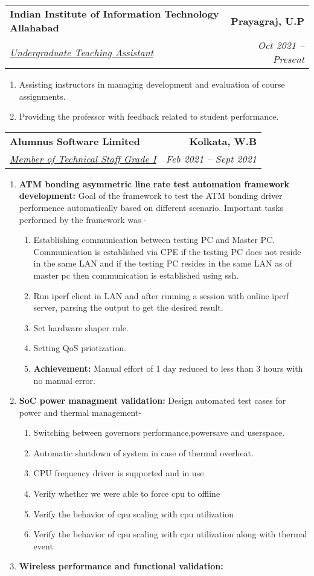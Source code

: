 \documentclass[letterpaper,11pt]{article}
\makeatletter
\newcommand{\resumeSubheading}[4]{
  \vspace{-2pt}\item
    \begin{tabular*}{1.0\textwidth}[t]{l@{\extracolsep{\fill}}r}
      \textbf{\large#1} & \textbf{\small #2} \\
      \textit{\large#3} & \textit{\small #4} \\
      
    \end{tabular*}\vspace{-7pt}
}
\makeatother
\begin{document}
	\resumeSubheading
      {Indian Institute of Information Technology Allahabad}{Prayagraj, U.P}
      {\underline{Undergraduate Teaching Assistant}}{Oct 2021 -- Present}
      \begin{enumerate}
		\item Assisting instructors in managing development and evaluation of course assignments.
		\item Providing the professor with feedback related to student performance.
	  \end{enumerate}
    \resumeSubheading
      {Alumnus Software Limited}{Kolkata, W.B}
      {\underline{Member of Technical Staff Grade I}}{Feb 2021 -- Sept 2021}
      \begin{enumerate}
      \item \textbf{ATM bonding asymmetric line rate test automation framework development: }\newline
      Goal of the framework to test the ATM bonding driver performence automatically based on different scenario. Important tasks performed by the framework was -
      \begin{enumerate} 
      \item Establishing communication between testing PC and Master PC. Communication is established via CPE if the testing PC does not reside in the same LAN and if the testing PC resides in the same LAN as of master pc then communication is established using ssh.
      \item Run iperf client in LAN and after running a session with online iperf server, parsing the output to get the desired result. 
      \item Set hardware shaper rule.
      \item Setting QoS priotization.
      \item \textbf{Achievement:} Manual effort of 1 day reduced to less than 3 hours with no manual error.
      \end{enumerate}
      \item \textbf{SoC power managment validation:}\newline
      Design automated test cases for power and thermal management-
      \begin{enumerate}
      \item Switching between governors performance,powersave and userspace.
      \item Automatic shutdown of system in case of thermal overheat.
      \item CPU frequency driver is supported and in use
      \item Verify whether we were able to force cpu to offline
      \item Verify the behavior of cpu scaling with cpu utilization
      \item Verify the behavior of cpu scaling with cpu utilization along with thermal event
      \end{enumerate}
      \item \textbf{Wireless performance and functional validation:}
      \end{enumerate}
		
\end{document}
